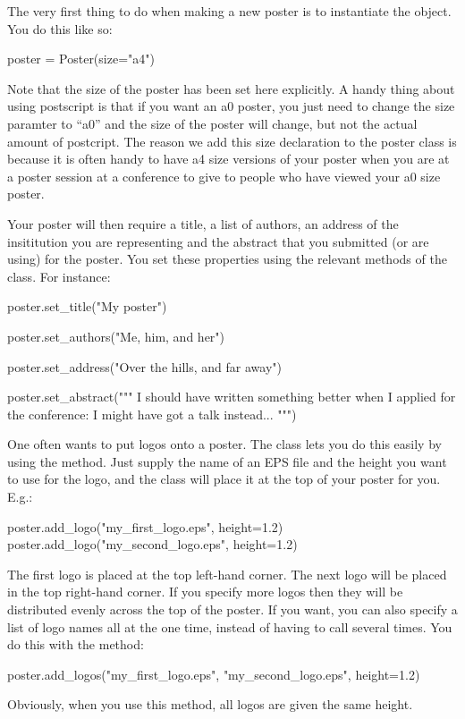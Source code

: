 The very first thing to do when making a new poster is to instantiate the
 object.  You do this like so:
\begin{python}
poster = Poster(size="a4")
\end{python}
Note that the size of the poster has been set here explicitly.  A handy
thing about using postscript is that if you want an a0 poster, you just need
to change the size paramter to ``a0'' and the size of the poster will
change, but not the actual amount of postcript.  The reason we add this size
declaration to the poster class is because it is often handy to have a4 size
versions of your poster when you are at a poster session at a conference to
give to people who have viewed your a0 size poster.

Your poster will then require a title, a list of authors, an address of the
insititution you are representing and the abstract that you submitted (or
are using) for the poster.  You set these properties using the relevant
 methods of the  class.  For instance:
\begin{python}
poster.set_title("My poster")

poster.set_authors("Me, him, and her")

poster.set_address("Over the hills, and far away")

poster.set_abstract("""
I should have written something better when I applied for the conference: I
might have got a talk instead...
""")
\end{python}

One often wants to put logos onto a poster.  The  class lets
you do this easily by using the  method.  Just supply the
name of an EPS file and the height you want to use for the logo, and the
class will place it at the top of your poster for you.  E.g.:
\begin{python}
poster.add_logo("my_first_logo.eps", height=1.2)
poster.add_logo("my_second_logo.eps", height=1.2)
\end{python}
The first logo is placed at the top left-hand corner.  The next logo will be
placed in the top right-hand corner.  If you specify more logos then they
will be distributed evenly across the top of the poster.  If you want, you
can also specify a list of logo names all at the one time, instead of having
to call  several times.  You do this with the
 method:
\begin{python}
poster.add_logos("my_first_logo.eps", "my_second_logo.eps", height=1.2)
\end{python}
Obviously, when you use this method, all logos are given the same height.

